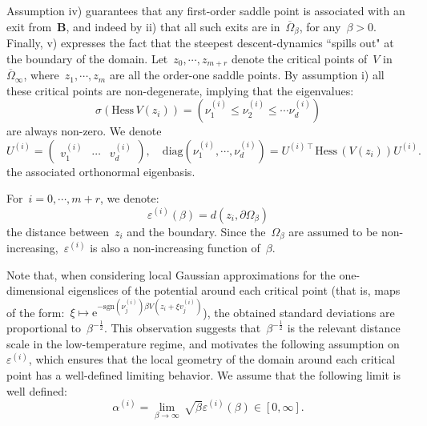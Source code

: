 \documentclass[10pt]{article}
\newcommand{\e}{\mathrm{e}}
\newcommand{\Hess}{\mathrm{Hess}\,}
\newcommand{\1}{\mathbbm 1}
\newcommand{\epsBoundary}[1]{\varepsilon^{(#1)}} %
\newcommand{\epsLimit}[1]{\alpha^{(#1)}} %
\newcommand{\hessPassage}[2][]{U^{(#2)#1}} %
\newcommand{\hessEigvec}[2]{v^{(#1)}_{#2}} %
\newcommand{\hessEigval}[2]{\nu^{(#1)}_{#2}} %
\newcommand{\varepsiloni}{\varepsilon^{(i)}}
\begin{document}
    Assumption iv) guarantees that any first-order saddle point is associated with an exit from~$\mathbf B$, and indeed by ii) that all such exits are in~$\overline\Omega_\beta$, for any~$\beta>0$.
    Finally, v) expresses the fact that the steepest descent-dynamics ``spills out" at the boundary of the domain.
    Let~$z_0,\dotsm,z_{m+r}$ denote the critical points of~$V$ in~$\overline{\Omega}_\infty$, where~$z_1,\dotsm,z_m$ are all the order-one saddle points. 
    By assumption i) all these critical points are non-degenerate, implying that the eigenvalues:
    \begin{equation}
        \label{eq:eigvals_hessian}
        \sigma(\Hess V(z_i)) = \left(\hessEigval{i}{1} \leq \hessEigval{i}{2} \leq \dotsm \hessEigval{i}{d}\right)
    \end{equation}
    are always non-zero. We denote
    \begin{equation}
        \label{eq:eigvecs_hessian}
        \hessPassage{i} =\begin{pmatrix}\hessEigvec{i}{1}&\dotsm&\hessEigvec{i}{d}\end{pmatrix},\quad \mathrm{diag}(\hessEigval{i}{1},\dotsm,\hessEigval{i}{d}) = \hessPassage[\intercal]{i} \Hess(V(z_i)) \hessPassage{i}.
    \end{equation}
    the associated orthonormal eigenbasis.

    For~$i=0,\dotsm,m+r$, we denote:
    \begin{equation}
        \label{eq:varepsilon}
        \epsBoundary{i}(\beta) = d\left(z_i,\partial\Omega_\beta\right)
    \end{equation}
    the distance between~$z_i$ and the boundary. Since the~$\Omega_\beta$ are assumed to be non-increasing,~$\varepsiloni$ is also a non-increasing function of~$\beta$.

    Note that, when considering local Gaussian approximations for the one-dimensional eigenslices of the potential around each critical point (that is, maps of the form:~$\xi \mapsto \e^{-\mathrm{sgn}(\hessEigval{i}{j})\beta V(z_i+\xi\hessEigvec{i}{j})}$), the obtained standard deviations are proportional to~$\beta^{-\frac 12}$. 
    This observation suggests that~$\beta^{-\frac12}$ is the relevant distance scale in the low-temperature regime, and motivates the following assumption on~$\epsBoundary{i}$, which ensures that the local geometry of the domain around each critical point has a well-defined limiting behavior. 
    We assume that the following limit is well defined:
    \begin{equation}
        \label{eq:epsLimit_definition}
        \epsLimit{i} =\underset{\beta\to\infty}{\lim}\, \sqrt\beta\epsBoundary{i}(\beta) \in [0,\infty].
    \end{equation}
\end{document}
